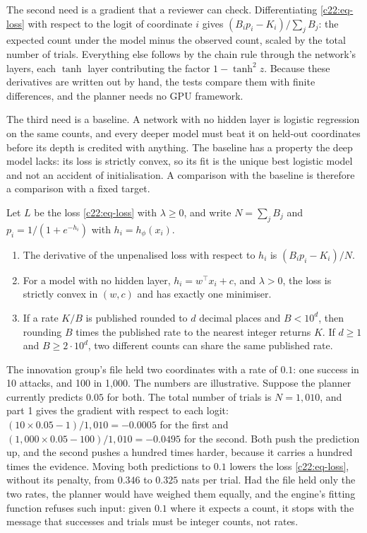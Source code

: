 The second need is a gradient that a reviewer can check. Differentiating \eqref{c22:eq-loss} with respect to the
logit of coordinate $i$ gives $(B_ip_i-K_i)/\sum_jB_j$: the expected count under the model minus the
observed count, scaled by the total number of trials. Everything else follows by the chain rule
through the network's layers, each $\tanh$ layer contributing the factor $1-\tanh^2z$. Because these
derivatives are written out by hand, the tests compare them with finite differences, and the
planner needs no GPU framework.

The third need is a baseline. A network with no hidden layer is logistic regression on the same
counts, and every deeper model must beat it on held-out coordinates before its depth is credited
with anything. The baseline has a property the deep model lacks: its loss is strictly convex, so
its fit is the unique best logistic model and not an accident of initialisation. A comparison with
the baseline is therefore a comparison with a fixed target.

\begin{proposition}\label{c22:prop-count}
Let $L$ be the loss \eqref{c22:eq-loss} with $\lambda\ge0$, and write $N=\sum_jB_j$ and $p_i=1/(1+e^{-h_i})$ with $h_i=h_\phi(x_i)$.
\begin{enumerate}
\item The derivative of the unpenalised loss with respect to $h_i$ is $(B_ip_i-K_i)/N$.
\item For a model with no hidden layer, $h_i=w^\top x_i+c$, and $\lambda>0$, the loss is strictly convex in $(w,c)$ and has exactly one minimiser.
\item If a rate $K/B$ is published rounded to $d$ decimal places and $B<10^d$, then rounding $B$ times the published rate to the nearest integer returns $K$. If $d\ge1$ and $B\ge2\cdot10^d$, two different counts can share the same published rate.
\end{enumerate}
\end{proposition}

\begin{example}\label{c22:ex-rate}
The innovation group's file held two coordinates with a rate of $0.1$: one success in 10 attacks, and 100 in 1,000. The numbers are
illustrative. Suppose the planner currently predicts $0.05$ for both. The total number of trials is
$N=1{,}010$, and part 1 gives the gradient with respect to each logit: $(10\times0.05-1)/1{,}010=-0.0005$
for the first and $(1{,}000\times0.05-100)/1{,}010=-0.0495$ for the second. Both push the prediction
up, and the second pushes a hundred times harder, because it carries a hundred times the evidence.
Moving both predictions to $0.1$ lowers the loss \eqref{c22:eq-loss}, without its penalty, from $0.346$ to $0.325$ nats
per trial. Had the file held only the two rates, the planner would have weighed them equally, and
the engine's fitting function refuses such input: given $0.1$ where it expects a count, it stops
with the message that successes and trials must be integer counts, not rates.
\end{example}

